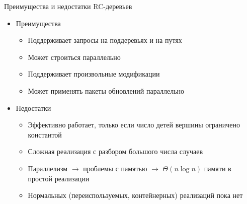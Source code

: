 \documentclass[hyperref=unicode,graphics=pdflatex,13pt]{beamer}
\begin{document}
\begin{frame}[shrink]{Преимущества и недостатки RC-деревьев}
\begin{itemize}
        \item Преимущества
	\begin{itemize}
    		\item Поддерживает запросы на поддеревьях и на путях
		\item Может строиться параллельно
		\item Поддерживает произвольные модификации
		\item Может применять пакеты обновлений параллельно
	\end{itemize}
\end{itemize}
\begin{itemize}
        \item Недостатки
	\begin{itemize}
	    \item Эффективно работает, только если число детей вершины ограничено константой
	    \item Сложная реализация с разбором большого числа случаев
	    \item Параллелизм $\to$ проблемы с памятью $\to$ $\Theta(n \log n)$ памяти в простой реализации
	    \item Нормальных (переиспользуемых, контейнерных) реализаций пока нет
	\end{itemize}
\end{itemize}
\end{frame}
\end{document}
